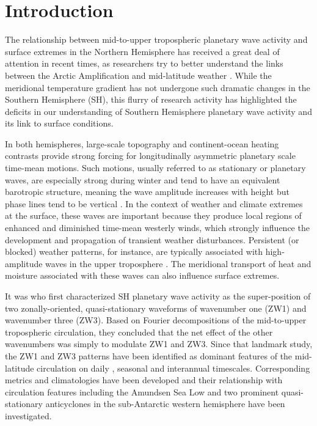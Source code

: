 \section{Introduction}\label{s:introduction}

The relationship between mid-to-upper tropospheric planetary wave activity and surface extremes in the Northern Hemisphere has received a great deal of attention in recent times, as researchers try to better understand the links between the Arctic Amplification and mid-latitude weather \citep[e.g.][]{Cohen2014,Screen2014}. While the meridional temperature gradient has not undergone such dramatic changes in the Southern Hemisphere (SH), this flurry of research activity has highlighted the deficits in our understanding of Southern Hemisphere planetary wave activity and its link to surface conditions. 

In both hemispheres, large-scale topography and continent-ocean heating contrasts provide strong forcing for longitudinally asymmetric planetary scale time-mean motions. Such motions, usually referred to as stationary or planetary waves, are especially strong during winter and tend to have an equivalent barotropic structure, meaning the wave amplitude increases with height but phase lines tend to be vertical \citep{Holton2013}. In the context of weather and climate extremes at the surface, these waves are important because they produce local regions of enhanced and diminished time-mean westerly winds, which strongly influence the development and propagation of transient weather disturbances. Persistent (or blocked) weather patterns, for instance, are typically associated with high-amplitude waves in the upper troposphere \citep[e.g.][]{Trenberth1985,Renwick2005}. The meridional transport of heat and moisture associated with these waves can also influence surface extremes. 

It was \citet{vanLoon1972} who first characterized SH planetary wave activity as the super-position of two zonally-oriented, quasi-stationary waveforms of wavenumber one (ZW1) and wavenumber three (ZW3). Based on Fourier decompositions of the mid-to-upper tropospheric circulation, they concluded that the net effect of the other wavenumbers was simply to modulate ZW1 and ZW3. Since that landmark study, the ZW1 and ZW3 patterns have been identified as dominant features of the mid-latitude circulation on daily \citep[e.g.][]{Kidson1988}, seasonal \citep[e.g.][]{Mo1985} and interannual \citep[e.g.][]{Karoly1989} timescales. Corresponding metrics and climatologies have been developed \citep{Raphael2004,Hobbs2007} and their relationship with circulation features including the Amundsen Sea Low \citep{Turner2013} and two prominent quasi-stationary anticyclones in the sub-Antarctic western hemisphere \citep{Hobbs2010} have been investigated.


